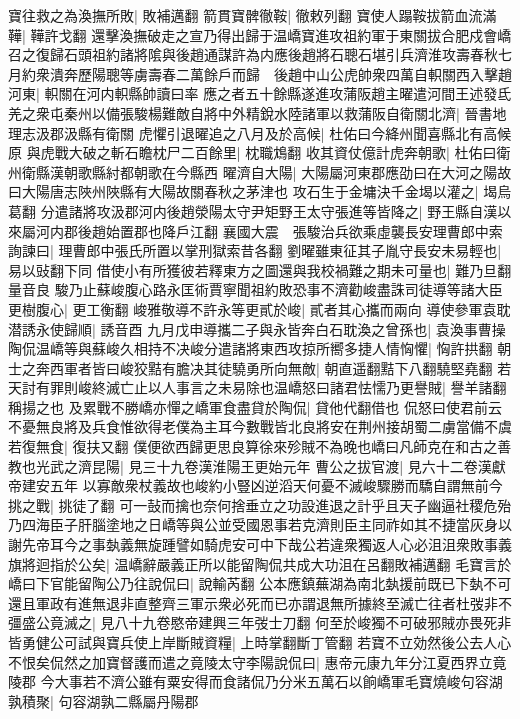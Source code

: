 寶往救之為渙撫所敗|{
	敗補邁翻}
箭貫寶髀徹鞍|{
	徹敕列翻}
寶使人蹋鞍拔箭血流滿鞾|{
	鞾許戈翻}
還擊渙撫破走之宣乃得出歸于温嶠寶進攻祖約軍于東關拔合肥戍會嶠召之復歸石頭祖約諸將隂與後趙通謀許為内應後趙將石聰石堪引兵濟淮攻壽春秋七月約衆潰奔歷陽聰等虜壽春二萬餘戶而歸　後趙中山公虎帥衆四萬自軹關西入擊趙河東|{
	軹關在河内軹縣帥讀曰率}
應之者五十餘縣遂進攻蒲阪趙主曜遣河間王述發氐羌之衆屯秦州以備張駿楊難敵自將中外精銳水陸諸軍以救蒲阪自衛關北濟|{
	晉書地理志汲郡汲縣有衛關}
虎懼引退曜追之八月及於高候|{
	杜佑曰今絳州聞喜縣北有高候原}
與虎戰大破之斬石瞻枕尸二百餘里|{
	枕職鴆翻}
收其資仗億計虎奔朝歌|{
	杜佑曰衛州衛縣漢朝歌縣紂都朝歌在今縣西}
曜濟自大陽|{
	大陽屬河東郡應劭曰在大河之陽故曰大陽唐志陜州陜縣有大陽故關春秋之茅津也}
攻石生于金墉決千金堨以灌之|{
	堨烏葛翻}
分遣諸將攻汲郡河内後趙滎陽太守尹矩野王太守張進等皆降之|{
	野王縣自漢以來屬河内郡後趙始置郡也降戶江翻}
襄國大震　張駿治兵欲乘虛襲長安理曹郎中索詢諫曰|{
	理曹郎中張氏所置以掌刑獄索昔各翻}
劉曜雖東征其子胤守長安未易輕也|{
	易以䜴翻下同}
借使小有所獲彼若釋東方之圖還與我校禍難之期未可量也|{
	難乃旦翻量音良}
駿乃止蘇峻腹心路永匡術賈寧聞祖約敗恐事不濟勸峻盡誅司徒導等諸大臣更樹腹心|{
	更工衡翻}
峻雅敬導不許永等更貳於峻|{
	貳者其心攜而兩向}
導使參軍袁耽潜誘永使歸順|{
	誘音酉}
九月戊申導攜二子與永皆奔白石耽渙之曾孫也|{
	袁渙事曹操}
陶侃温嶠等與蘇峻久相持不决峻分遣諸將東西攻掠所嚮多捷人情恟懼|{
	恟許拱翻}
朝士之奔西軍者皆曰峻狡黠有膽决其徒驍勇所向無敵|{
	朝直遥翻黠下八翻驍堅堯翻}
若天討有罪則峻終滅亡止以人事言之未易除也温嶠怒曰諸君怯懦乃更譽賊|{
	譽羊諸翻稱揚之也}
及累戰不勝嶠亦憚之嶠軍食盡貸於陶侃|{
	貸他代翻借也}
侃怒曰使君前云不憂無良將及兵食惟欲得老僕為主耳今數戰皆北良將安在荆州接胡蜀二虜當備不虞若復無食|{
	復扶又翻}
僕便欲西歸更思良算徐來殄賊不為晚也嶠曰凡師克在和古之善教也光武之濟昆陽|{
	見三十九卷漢淮陽王更始元年}
曹公之拔官渡|{
	見六十二卷漢獻帝建安五年}
以寡敵衆杖義故也峻約小豎凶逆滔天何憂不滅峻驟勝而驕自謂無前今挑之戰|{
	挑徒了翻}
可一鼔而擒也奈何捨垂立之功設進退之計乎且天子幽逼社稷危殆乃四海臣子肝腦塗地之日嶠等與公並受國恩事若克濟則臣主同祚如其不捷當灰身以謝先帝耳今之事埶義無旋踵譬如騎虎安可中下哉公若違衆獨返人心必沮沮衆敗事義旗將迴指於公矣|{
	温嶠辭嚴義正所以能留陶侃共成大功沮在呂翻敗補邁翻}
毛寶言於嶠曰下官能留陶公乃往說侃曰|{
	說輸芮翻}
公本應鎮蕪湖為南北埶援前既已下埶不可還且軍政有進無退非直整齊三軍示衆必死而已亦謂退無所據終至滅亡往者杜弢非不彊盛公竟滅之|{
	見八十九卷愍帝建興三年弢士刀翻}
何至於峻獨不可破邪賊亦畏死非皆勇健公可試與寶兵使上岸斷賊資糧|{
	上時掌翻斷丁管翻}
若寶不立効然後公去人心不恨矣侃然之加寶督護而遣之竟陵太守李陽說侃曰|{
	惠帝元康九年分江夏西界立竟陵郡}
今大事若不濟公雖有粟安得而食諸侃乃分米五萬石以餉嶠軍毛寶燒峻句容湖孰積聚|{
	句容湖孰二縣屬丹陽郡}
